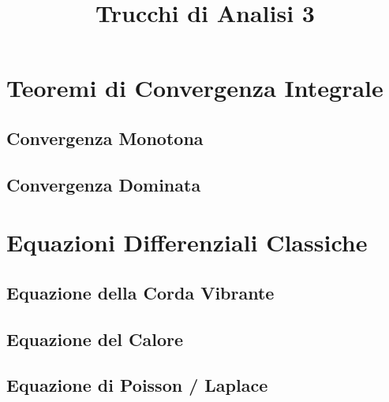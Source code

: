\documentclass[a4paper,NoNotes,GeneralMath]{stdmdoc}
\begin{document}
	\title{Trucchi di Analisi 3}
	
	\section*{Teoremi di Convergenza Integrale}
	\subsection*{Convergenza Monotona}
	\subsection*{Convergenza Dominata}
	
	\section*{Equazioni Differenziali Classiche}
	\subsection*{Equazione della Corda Vibrante}
	\subsection*{Equazione del Calore}
	\subsection*{Equazione di Poisson / Laplace}
	
\end{document}
